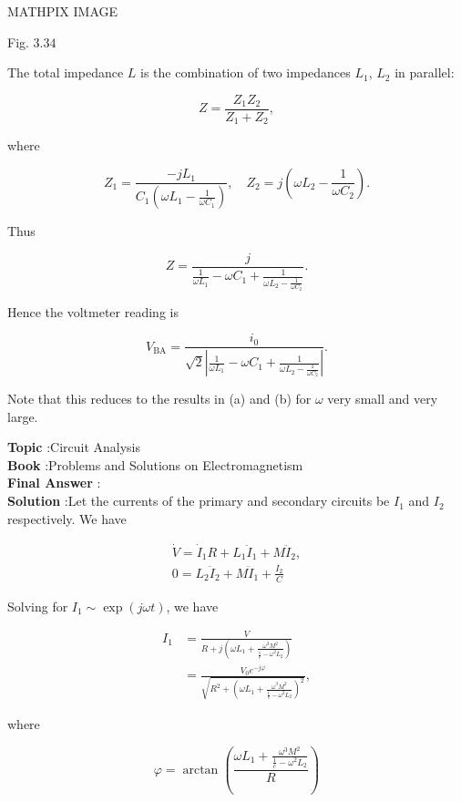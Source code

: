 \documentclass[10pt]{article}
\begin{document}
MATHPIX IMAGE

Fig. $3.34$

 The total impedance $L$ is the combination of two impedances $L_{1}$, $L_{2}$ in parallel:

$$
Z=\frac{Z_{1} Z_{2}}{Z_{1}+Z_{2}},
$$

where

$$
Z_{1}=\frac{-j L_{1}}{C_{1}\left(\omega L_{1}-\frac{1}{\omega C_{1}}\right)}, \quad Z_{2}=j\left(\omega L_{2}-\frac{1}{\omega C_{2}}\right) .
$$

Thus

$$
Z=\frac{j}{\frac{1}{\omega L_{1}}-\omega C_{1}+\frac{1}{\omega L_{2}-\frac{1}{\omega C_{2}}}} .
$$

Hence the voltmeter reading is

$$
V_{\mathrm{BA}}=\frac{i_{0}}{\sqrt{2}\left|\frac{1}{\omega L_{1}}-\omega C_{1}+\frac{1}{\omega L_{2}-\frac{1}{\omega C_{2}}}\right|} .
$$

Note that this reduces to the results in (a) and (b) for $\omega$ very small and very large. 

\textbf{Topic} :Circuit Analysis\\
\textbf{Book} :Problems and Solutions on Electromagnetism\\
\textbf{Final Answer} :\\


\textbf{Solution} :Let the currents of the primary and secondary circuits be $I_{1}$ and $I_{2}$ respectively. We have

$$
\begin{gathered}
\dot{V}=\dot{I}_{1} R+L_{1} \ddot{I}_{1}+M \ddot{I}_{2}, \\
0=L_{2} \ddot{I}_{2}+M \ddot{I}_{1}+\frac{I_{2}}{C}
\end{gathered}
$$

Solving for $I_{1} \sim \exp (j \omega t)$, we have

$$
\begin{aligned}
I_{1} &=\frac{V}{R+j\left(\omega L_{1}+\frac{\omega^{3} M^{2}}{\frac{1}{c}-\omega^{2} L_{2}}\right)} \\
&=\frac{V_{0} e^{-j \varphi}}{\sqrt{R^{2}+\left(\omega L_{1}+\frac{\omega^{3} M^{2}}{\frac{1}{c}-\omega^{2} L_{2}}\right)^{2}}},
\end{aligned}
$$

where

$$
\varphi=\arctan \left(\frac{\omega L_{1}+\frac{\omega^{3} M^{2}}{\frac{1}{c}-\omega^{2} L_{2}}}{R}\right)
$$
\end{document}
